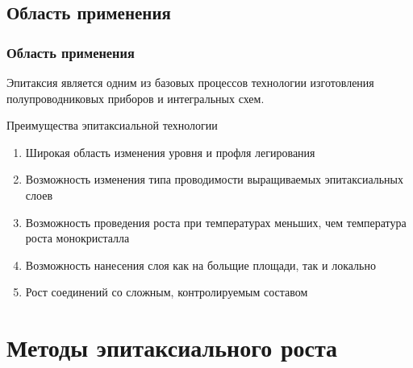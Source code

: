\documentclass[10pt,pdf,hyperref={unicode}, dvipsnames]{beamer}
\begin{document}
\begin{frame}[t]
\end{frame}


\subsection{Область применения}
\begin{frame}[t]
	\frametitle{Область применения}
	Эпитаксия является одним из базовых процессов технологии изготовления полупроводниковых приборов и интегральных
	схем.
	\vspace{20pt}

	Преимущества эпитаксиальной технологии
	\begin{enumerate}
		\item Широкая область изменения уровня и профля легирования 
		\item Возможность изменения типа проводимости выращиваемых эпитаксиальных слоев
		\item Возможность проведения роста при температурах меньших, чем температура роста монокристалла
		\item Возможность нанесения слоя как на больщие площади, так и локально
		\item Рост соединений со сложным, контролируемым составом
	\end{enumerate}

\end{frame}



\section{Методы эпитаксиального роста}
\end{document}
